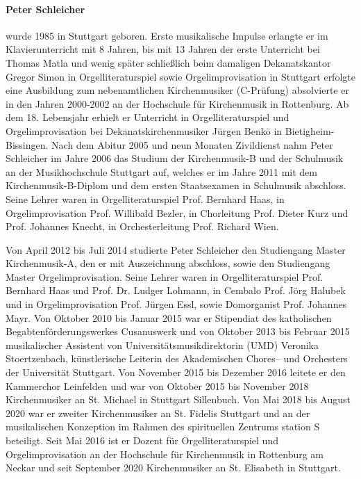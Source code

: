 \documentclass[a5paper,twoside,fontsize=11pt]{scrartcl}
\begin{document}
\paragraph{Peter Schleicher} wurde 1985 in Stuttgart geboren.
Erste musikalische Impulse erlangte er im Klavierunterricht mit 8 Jahren, bis mit 13 Jahren der erste Unterricht bei Thomas Matla und wenig später schließlich beim damaligen Dekanatskantor Gregor Simon in Orgelliteraturspiel sowie Orgelimprovisation in Stuttgart erfolgte eine Ausbildung zum nebenamtlichen Kirchenmusiker (C-Prüfung) absolvierte er in den Jahren 2000-2002 an der Hochschule für Kirchenmusik in Rottenburg.
Ab dem 18. Lebensjahr erhielt er Unterricht in Orgelliteraturspiel und Orgelimprovisation bei Dekanatskirchenmusiker Jürgen Benkö in Bietigheim-Bissingen.
Nach dem Abitur 2005 und neun Monaten Zivildienst nahm Peter Schleicher im Jahre 2006 das Studium der Kirchenmusik-B und der Schulmusik an der Musikhochschule Stuttgart auf, welches er im Jahre 2011 mit dem Kirchenmusik-B-Diplom und dem ersten Staatsexamen in Schulmusik abschloss.
Seine Lehrer waren in Orgelliteraturspiel Prof. Bernhard Haas, in Orgelimprovisation Prof. Willibald Bezler, in Chorleitung Prof. Dieter Kurz und Prof. Johannes Knecht, in Orchesterleitung Prof. Richard Wien.

Von April 2012 bis Juli 2014 studierte Peter Schleicher den Studiengang Master Kirchenmusik-A, den er mit Auszeichnung abschloss, sowie den Studiengang Master Orgelimprovisation.
Seine Lehrer waren in Orgelliteraturspiel Prof. Bernhard Haas und Prof. Dr. Ludger Lohmann, in Cembalo Prof. Jörg Halubek und in Orgelimprovisation Prof. Jürgen Essl, sowie Domorganist Prof. Johannes Mayr.
Von Oktober 2010 bis Januar 2015 war er Stipendiat des katholischen Begabtenförderungswerkes Cusanuswerk und von Oktober 2013 bis Februar 2015 musikalischer Assistent von Universitätsmusikdirektorin (UMD) Veronika Stoertzenbach, künstlerische Leiterin des Akademischen Chores– und Orchesters der Universität Stuttgart.
Von November 2015 bis Dezember 2016 leitete er den Kammerchor Leinfelden und war von Oktober 2015 bis November 2018 Kirchenmusiker an St. Michael in Stuttgart Sillenbuch.
Von Mai 2018 bis August 2020 war er zweiter Kirchenmusiker an St. Fidelis Stuttgart und an der musikalischen Konzeption im Rahmen des spirituellen Zentrums station S beteiligt.
Seit Mai 2016 ist er Dozent für Orgelliteraturspiel und Orgelimprovisation an der Hochschule für Kirchenmusik in Rottenburg am Neckar und seit September 2020 Kirchenmusiker an St. Elisabeth in Stuttgart.
\end{document}
